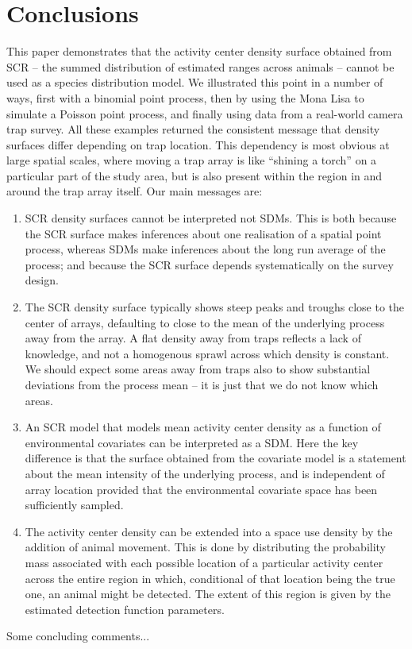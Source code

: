 \documentclass[a4paper,12pt]{article}
\begin{document}
\section{Conclusions}
This paper demonstrates that the activity center density surface obtained from SCR -- the summed distribution of estimated ranges across animals -- cannot be used as a species distribution model. We illustrated this point in a number of ways, first with a binomial point process, then by using the Mona Lisa to simulate a Poisson point process, and finally using data from a real-world camera trap survey. All these examples returned the consistent message that density surfaces differ depending on trap location. This dependency is most obvious at large spatial scales, where moving a trap array is like ``shining a torch'' on a particular part of the study area, but is also present within the region in and around the trap array itself. Our main messages are:
\begin{enumerate}
\item SCR density surfaces cannot be interpreted not SDMs. This is both because the SCR surface makes inferences about one realisation of a spatial point process, whereas SDMs make inferences about the long run average of the process; and because the SCR surface depends systematically on the survey design.
\item The SCR density surface typically shows steep peaks and troughs close to the center of arrays, defaulting to close to the mean of the underlying process away from the array. A flat density away from traps reflects a lack of knowledge, and not a homogenous sprawl across which density is constant. We should expect some areas away from traps also to show substantial deviations from the process mean -- it is just that we do not know which areas.
\item An SCR model that models mean activity center density as a function of environmental covariates can be interpreted as a SDM. Here the key difference is that the surface obtained from the covariate model is a statement about the mean intensity of the underlying process, and is independent of array location provided that the environmental covariate space has been sufficiently sampled.
\item The activity center density can be extended into a space use density by the addition of animal movement. This is done by distributing the probability mass associated with each possible location of a particular activity center across the entire region in which, conditional of that location being the true one, an animal might be detected. The extent of this region is given by the estimated detection function parameters. 
\end{enumerate}
Some concluding comments...





\end{document}
